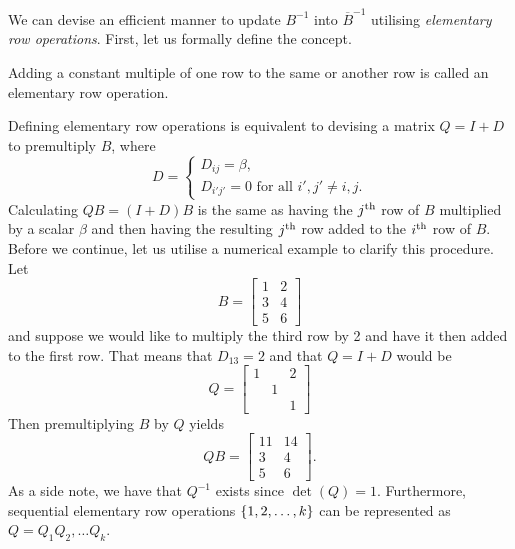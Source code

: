 We can devise an efficient manner to update $B^{-1}$ into $\overline{B}^{-1}$ utilising \emph{elementary row operations}. First, let us formally define the concept.

\begin{definition}
	Adding a constant multiple of one row to the same or another row is called an elementary row operation.
\end{definition}

Defining elementary row operations is equivalent to devising a matrix $Q = I + D$ to premultiply $B$, where
%
\begin{equation*}
	D = \begin{cases}
		D_{ij} = \beta, \\
	    D_{i'j'} = 0 \text{ for all $i',j' \neq i,j$}.  
	\end{cases}
\end{equation*}
%
Calculating $QB = (I + D)B$ is the same as having the $j^\text{th}$ row of $B$ multiplied by a scalar $\beta$ and then having the resulting $j^\text{th}$ row added to the $i^\text{th}$ row of $B$. Before we continue, let us utilise a numerical example to clarify this procedure.
%
Let
%
\begin{equation*} 
	B = \begin{bmatrix} 1 & 2 \\ 3 & 4 \\ 5 & 6
		\end{bmatrix}
\end{equation*}
%
and suppose we would like to multiply the third row by 2 and have it then added to the first row. That means that $D_{13} = 2$ and that $Q = I + D$ would be
%
\begin{equation*} 
	Q = \begin{bmatrix} 1 & & 2\\ & 1 & \\ & & 1 	\end{bmatrix}
\end{equation*}
%
Then premultiplying $B$ by $Q$ yields
%
\begin{equation*}
	QB = \begin{bmatrix} 11 & 14 \\ 3 & 4 \\ 5 & 6
		 \end{bmatrix}.
\end{equation*}	
%
As a side note, we have that $Q^{-1}$ exists since $\det(Q) = 1$. Furthermore, sequential elementary row operations $\left\{ 1,2,\dots, k \right \}$ can be represented as $Q = Q_1Q_2,\dots Q_k$.

